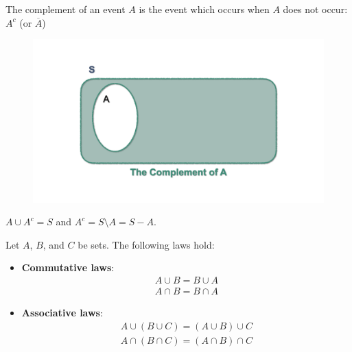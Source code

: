\documentclass[notes=show]{beamer}\usepackage[]{graphicx}\usepackage[]{color}
\begin{document}
\begin{frame}{\secname}
The complement of an event $A$ is the event which occurs when $A$ does not occur: $A^{c}$ (or $\overline{A}$)
\pause
\begin{figure}[h!]
\centering
\includegraphics[scale=0.1]{img/charts/charts.007.png}
\end{figure}
\pause
\begin{center}
$A \cup A^c = S$ and $A^c = S \setminus A = S-A$.
\end{center}
\end{frame}

\begin{frame}{\secname}
Let $A$, $B$, and $C$ be sets. The following laws hold:
\begin{itemize}
\item \textbf{Commutative laws}:
\begin{eqnarray*}
A \cup B = B \cup A \\
A \cap B = B \cap A
\end{eqnarray*}
\item \textbf{Associative laws}:
\begin{eqnarray*}
A \cup (B \cup C) = (A \cup B) \cup C \\
A \cap (B \cap C) = (A \cap B) \cap C
\end{eqnarray*}
\end{itemize}
\end{frame}
\end{document}
